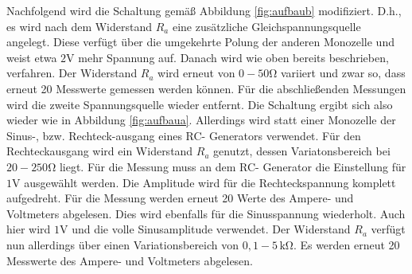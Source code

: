 \noindent Nachfolgend wird die Schaltung gemäß Abbildung \ref{fig:aufbaub} modifiziert.
D.h., es wird nach dem Widerstand $R_a$ eine zusätzliche Gleichspannungsquelle angelegt.
Diese verfügt über die umgekehrte Polung der anderen Monozelle und weist etwa $2 \mathrm{V}$ mehr Spannung auf.
Danach wird wie oben bereits beschrieben, verfahren.
Der Widerstand $R_a$ wird erneut von $0-50 \si{\ohm}$ variiert und zwar so, dass erneut 20 Messwerte gemessen werden können.
Für die abschließenden Messungen wird die zweite Spannungsquelle wieder entfernt.
Die Schaltung ergibt sich also wieder wie in Abbildung \ref{fig:aufbaua}.
Allerdings wird statt einer Monozelle der Sinus-, bzw. Rechteck-ausgang eines RC- Generators verwendet.
Für den Rechteckausgang wird ein Widerstand $R_a$ genutzt, dessen Variatonsbereich bei $20-250 \si{\ohm}$ liegt.
Für die Messung muss an dem RC- Generator die Einstellung für $1 \si{\volt}$ ausgewählt werden.
Die Amplitude wird für die Rechteckspannung komplett aufgedreht.
Für die Messung werden erneut 20 Werte des Ampere- und Voltmeters abgelesen.
Dies wird ebenfalls für die Sinusspannung wiederholt.
Auch hier wird $1 \si{\volt}$ und die volle Sinusamplitude verwendet.
Der Widerstand $R_a$ verfügt nun allerdings über einen Variationsbereich von $0,1 - 5 \,\si{\kilo\ohm}$.
Es werden erneut 20 Messwerte des Ampere- und Voltmeters abgelesen.
